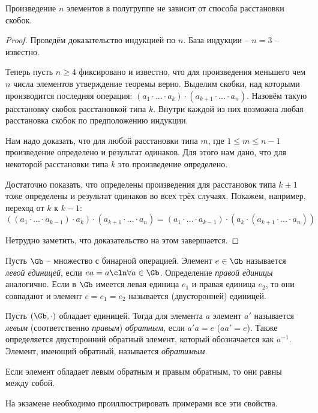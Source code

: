 \begin{theorem}
  Произведение $n$ элементов в полугруппе не зависит от способа расстановки скобок.
\end{theorem}
\begin{proof}
  Проведём доказательство индукцией по $n$. База индукции -- $n=3$ -- известно.

  Теперь пусть $n\ge4$ фиксировано и известно, что для произведения меньшего чем $n$ числа элементов утверждение теоремы верно. Выделим скобки, над которыми производится последняя операция: $(a_1\cdot\dots\cdot a_k)\cdot(a_{k+1}\cdot\dots\cdot a_n)$. Назовём такую расстановку скобок расстановкой типа $k$. Внутри каждой из них возможна любая расстановка скобок по предположению индукции.

  Нам надо доказать, что для любой расстановки типа $m$, где $1\le m\le n-1$ произведение определено и результат одинаков. Для этого нам дано, что для некоторой расстановки типа $k$ это произведение определено.

  Достаточно показать, что определены произведения для расстановок типа $k\pm1$ тоже определены и результат одинаков во всех трёх случаях. Покажем, например, переход от $k$ к $k-1$:
  $$((a_1\cdot\dots\cdot a_{k-1})\cdot a_k)\cdot(a_{k+1}\cdot\dots\cdot a_n)=(a_1\cdot\dots\cdot a_{k-1})\cdot(a_k\cdot(a_{k+1}\cdot\dots\cdot a_n))$$

  Нетрудно заметить, что доказательство на этом завершается.
\end{proof}

\begin{df}
  Пусть $\Gb$ -- множество с бинарной операцией. Элемент $e\in\Gb$ называется \emph{левой единицей}, если $ea=a\cln\forall a\in\Gb$. Определение \emph{правой единицы} аналогично. Если в $\Gb$ имеется левая единица $e_1$ и правая единица $e_2$, то они совпадают и элемент $e=e_1=e_2$ называется (двусторонней) единицей.
\end{df}
\begin{df}
  Пусть $(\Gb,\cdot)$ обладает единицей. Тогда для элемента $a$ элемент $a'$ называется \emph{левым} (соответственно \emph{правым}) \emph{обратным}, если $a'a=e$ ($aa'=e$). Также определяется двусторонний обратный элемент, который обозначается как $a^{-1}$. Элемент, имеющий обратный, называется \emph{обратимым}.
\end{df}
\begin{theorem}
  Если элемент обладает левым обратным и правым обратным, то они равны между собой.
\end{theorem}
\begin{note}
  На экзамене необходимо проиллюстрировать примерами все эти свойства. %
\end{note}

